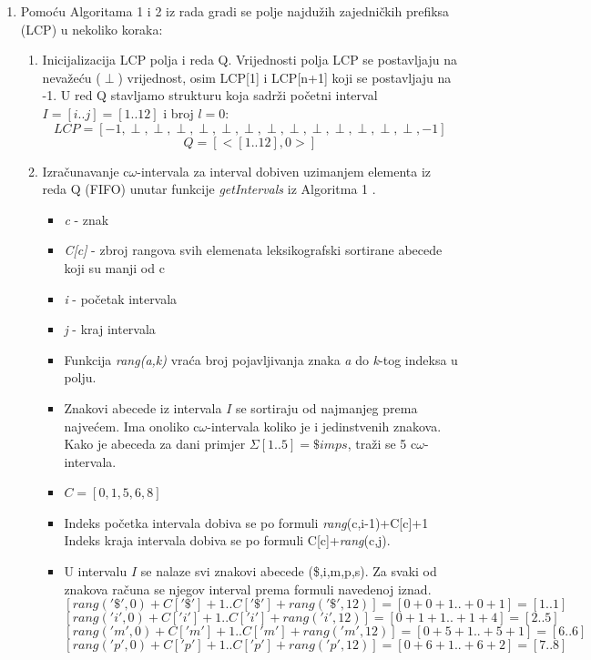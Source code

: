 \documentclass[a4paper,12pt]{article}
\begin{document}
\begin{enumerate}
	\item Pomoću Algoritama 1 i 2 iz rada \cite{beller2013} gradi se polje najdužih zajedničkih prefiksa (LCP) u nekoliko koraka:
	\begin{enumerate}
		\item Inicijalizacija LCP polja i reda Q. Vrijednosti polja LCP se postavljaju na nevažeću (\textbf{$\perp$}) vrijednost, osim LCP[1] i LCP[n+1] koji se postavljaju na -1. U red Q stavljamo strukturu koja sadrži početni interval $I = [i..j]=[1..12]$ i broj $\textit{l}=0$:\\
	 	$$LCP = [-1,\perp,\perp,\perp,\perp,\perp,\perp,\perp,\perp,\perp,\perp,\perp,\perp, \perp, -1]$$
		$$Q = [<[1..12],0>]$$
		\item Izračunavanje c$\omega$-intervala za interval dobiven uzimanjem elementa iz reda Q (FIFO) unutar funkcije \textit{getIntervals} iz Algoritma 1 \cite{beller2013}.
			\begin{itemize}
				\item \textit{c} - znak
				\item \textit{C[c]} - zbroj rangova svih elemenata leksikografski sortirane abecede koji su manji od c
			    \item \textit{i} - početak intervala
			    \item \textit{j} - kraj intervala
			    \item Funkcija \textit{rang(a,k)} vraća broj pojavljivanja znaka \textit{a} do \textit{k}-tog indeksa u polju. 
			    \item Znakovi abecede iz intervala $I$ se sortiraju od najmanjeg prema najvećem. Ima onoliko c$\omega$-intervala koliko je i jedinstvenih znakova. Kako je abeceda za dani primjer $\Sigma[1..5]=\$imps$, traži se 5 c$\omega$-intervala.
			    \item $C = [0,1,5,6,8]$
			    \item Indeks početka intervala dobiva se po formuli \textit{rang}(c,i-1)+C[c]+1 Indeks kraja intervala dobiva se po formuli C[c]+\textit{rang}(c,j).
			    \item U intervalu $I$ se nalaze svi znakovi abecede (\$,i,m,p,s). Za svaki od znakova računa se njegov interval prema formuli navedenoj iznad.
					  $$ [\textit{rang}('\$',0)+C['\$']+1..C['\$']+\textit{rang}('\$',12)]=[0+0+1..+0+1]=[1..1] $$
			    	  $$ [\textit{rang}('i',0)+C['i']+1..C['i']+\textit{rang}('i',12)]=[0+1+1..+1+4]=[2..5] $$
			    	  $$ [\textit{rang}('m',0)+C['m']+1..C['m']+\textit{rang}('m',12)]=[0+5+1..+5+1]=[6..6] $$
			    	  $$ [\textit{rang}('p',0)+C['p']+1..C['p']+\textit{rang}('p',12)]= [0+6+1..+6+2]=[7..8] $$

\end{itemize}
\end{enumerate}
\end{enumerate}
\end{document}
